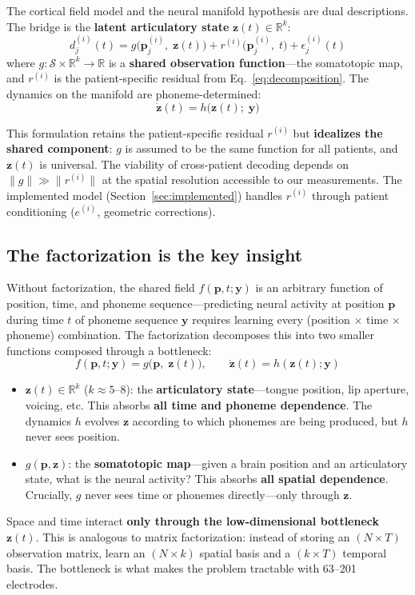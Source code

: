 \documentclass[11pt,letterpaper]{article}
\newcommand{\bfp}{\mathbf{p}}
\newcommand{\bfz}{\mathbf{z}}
\newcommand{\bfy}{\mathbf{y}}
\newcommand{\cS}{\mathcal{S}}
\newcommand{\R}{\mathbb{R}}
\begin{document}
The cortical field model and the neural manifold hypothesis are dual descriptions. The bridge is the \textbf{latent articulatory state} $\bfz(t) \in \R^k$:
\begin{equation}\label{eq:obs-function}
\boxed{d_j^{(i)}(t) = g\bigl(\bfp_j^{(i)},\; \bfz(t)\bigr) + r^{(i)}\bigl(\bfp_j^{(i)},\; t\bigr) + \epsilon_j^{(i)}(t)}
\end{equation}
where $g: \cS \times \R^k \to \R$ is a \textbf{shared observation function}---the somatotopic map, and $r^{(i)}$ is the patient-specific residual from Eq.~\eqref{eq:decomposition}. The dynamics on the manifold are phoneme-determined:
\begin{equation}\label{eq:dynamics}
\dot{\bfz}(t) = h\bigl(\bfz(t);\; \bfy\bigr)
\end{equation}

This formulation retains the patient-specific residual $r^{(i)}$ but \textbf{idealizes the shared component}: $g$ is assumed to be the same function for all patients, and $\bfz(t)$ is universal. The viability of cross-patient decoding depends on $\|g\| \gg \|r^{(i)}\|$ at the spatial resolution accessible to our measurements. The implemented model (Section~\ref{sec:implemented}) handles $r^{(i)}$ through patient conditioning ($e^{(i)}$, geometric corrections).

\subsection{The factorization is the key insight}

Without factorization, the shared field $f(\bfp, t; \bfy)$ is an arbitrary function of position, time, and phoneme sequence---predicting neural activity at position $\bfp$ during time $t$ of phoneme sequence $\bfy$ requires learning every (position $\times$ time $\times$ phoneme) combination. The factorization decomposes this into two smaller functions composed through a bottleneck:
\begin{equation}
f(\bfp, t; \bfy) = g\bigl(\bfp,\; \bfz(t)\bigr), \qquad \dot{\bfz}(t) = h(\bfz(t); \bfy)
\end{equation}
\begin{itemize}[leftmargin=2em]
\item $\bfz(t) \in \R^k$ ($k \approx 5$--$8$): the \textbf{articulatory state}---tongue position, lip aperture, voicing, etc. This absorbs \textbf{all time and phoneme dependence}. The dynamics $h$ evolves $\bfz$ according to which phonemes are being produced, but $h$ never sees position.
\item $g(\bfp, \bfz)$: the \textbf{somatotopic map}---given a brain position and an articulatory state, what is the neural activity? This absorbs \textbf{all spatial dependence}. Crucially, $g$ never sees time or phonemes directly---only through $\bfz$.
\end{itemize}
Space and time interact \textbf{only through the low-dimensional bottleneck} $\bfz(t)$. This is analogous to matrix factorization: instead of storing an $(N \times T)$ observation matrix, learn an $(N \times k)$ spatial basis and a $(k \times T)$ temporal basis. The bottleneck is what makes the problem tractable with 63--201 electrodes.
\end{document}
